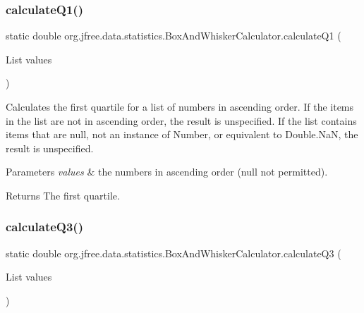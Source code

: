 \subsubsection{\texorpdfstring{calculate\+Q1()}{calculateQ1()}}
{\footnotesize\ttfamily static double org.\+jfree.\+data.\+statistics.\+Box\+And\+Whisker\+Calculator.\+calculate\+Q1 (\begin{DoxyParamCaption}\item[{List}]{values }\end{DoxyParamCaption})\hspace{0.3cm}{\ttfamily [static]}}

Calculates the first quartile for a list of numbers in ascending order. If the items in the list are not in ascending order, the result is unspecified. If the list contains items that are {\ttfamily null}, not an instance of {\ttfamily Number}, or equivalent to {\ttfamily Double.\+NaN}, the result is unspecified.


\begin{DoxyParams}{Parameters}
{\em values} & the numbers in ascending order ({\ttfamily null} not permitted).\\
\hline
\end{DoxyParams}
\begin{DoxyReturn}{Returns}
The first quartile. 
\end{DoxyReturn}
\mbox{\label{classorg_1_1jfree_1_1data_1_1statistics_1_1_box_and_whisker_calculator_acf1792d89cb7bb1f41ccb1d054628f98}} 
\subsubsection{\texorpdfstring{calculate\+Q3()}{calculateQ3()}}
{\footnotesize\ttfamily static double org.\+jfree.\+data.\+statistics.\+Box\+And\+Whisker\+Calculator.\+calculate\+Q3 (\begin{DoxyParamCaption}\item[{List}]{values }\end{DoxyParamCaption})\hspace{0.3cm}{\ttfamily [static]}}

